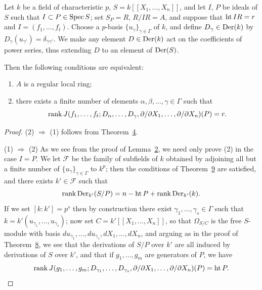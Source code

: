 \begin{theorem}\label{thm:30.10}
Let $k$ be a field of characteristic $p$, $S = k[[X_1, \ldots, X_n]]$, and let $I$, $P$ be
ideals of $S$ such that $I \subset P \in \operatorname{Spec} S$; set $S_P = R$, $R/IR = A$, and suppose
that $\operatorname{ht} IR = r$ and $I = (f_1, \ldots, f_t)$. Choose a $p$-basis $\{u_\gamma\}_{\gamma \in \Gamma}$ of
$k$, and define $D_\gamma \in \operatorname{Der}(k)$ by $D_\gamma(u_{\gamma'}) = \delta_{\gamma\gamma'}$. We make
any element $D \in \operatorname{Der}(k)$ act on the coefficients of power series, thus
extending $D$ to an element of $\operatorname{Der}(S)$.

Then the following conditions are equivalent:
\begin{enumerate}[(1)]
  \item $A$ is a regular local ring;
  \item there exists a finite number of elements $\alpha, \beta, \ldots, \gamma \in \Gamma$
        such that
        \[
          \operatorname{rank} J(f_1, \ldots, f_t; D_\alpha, \ldots, D_\gamma,
              \partial/\partial X_1, \ldots, \partial/\partial X_n)(P) = r.
        \]
\end{enumerate}
\end{theorem}

\begin{proof}
(2) $\Rightarrow$ (1) follows from Theorem~\hyperref[thm:30.4]{4}.

(1) $\Rightarrow$ (2) As we see from the proof of Lemma~\hyperref[lem:30.2]{2}, we need only
prove (2) in the case $I = P$. We let $\mathcal{F}$ be the family of subfields of $k$
obtained by adjoining all but a finite number of $\{u_\gamma\}_{\gamma \in \Gamma}$ to $k^p$;
then the conditions of Theorem~\hyperref[thm:30.9]{9} are satisfied, and there exists
$k' \in \mathcal{F}$ such that
\[
  \operatorname{rank} \operatorname{Der}_{k'}(S/P) = n - \operatorname{ht} P + \operatorname{rank} \operatorname{Der}_{k'}(k).
\]
If we set $[k : k'] = p^s$ then by construction there exist
$\gamma_1, \ldots, \gamma_s \in \Gamma$ such that $k = k'(u_{\gamma_1}, \ldots, u_{\gamma_s})$; now set
$C = k'[[X_1, \ldots, X_n]]$, so that $\Omega_{S/C}$ is the free $S$-module with basis
$du_{\gamma_1}, \ldots, du_{\gamma_s}, dX_1, \ldots, dX_n$, and arguing as in the proof of
Theorem~\hyperref[thm:30.8]{8}, we see that the derivations of $S/P$ over $k'$ are all induced by
derivations of $S$ over $k'$, and that if $g_1, \ldots, g_m$ are generators of $P$, we have
\[
  \operatorname{rank} J(g_1, \ldots, g_m; D_{\gamma_1}, \ldots, D_{\gamma_s},
      \partial/\partial X_1, \ldots, \partial/\partial X_n)(P) = \operatorname{ht} P.
\]
\end{proof}

